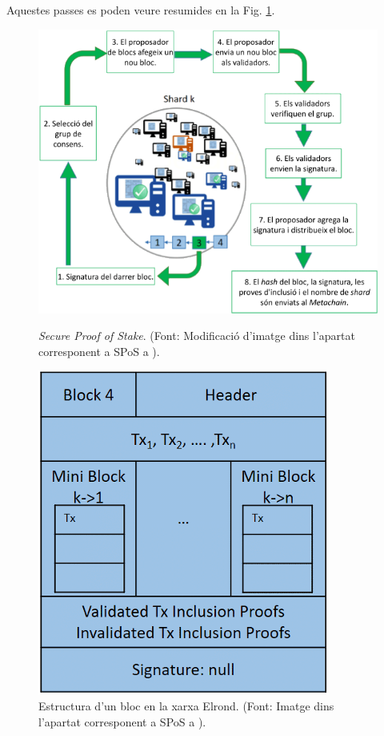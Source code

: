 \documentclass[11pt,a4paper]{article}
\begin{document}
Aquestes passes es poden veure resumides en la Fig. \ref{fig:SPoS}.

\begin{figure}[h]
  \centering
  \begin{minipage}[b]{0.65\textwidth}
    \includegraphics[width=\textwidth]{SPoS01.png}
    \caption{\textit{Secure Proof of Stake}. (Font: Modificació d'imatge dins l'apartat corresponent a SPoS a \cite{elrond2022}).}
    \label{fig:SPoS}
  \end{minipage}
  \hfill
  \begin{minipage}[b]{0.3\textwidth}
    \includegraphics[width=\textwidth]{SPoS02.png}
    \caption{Estructura d'un bloc en la xarxa Elrond. (Font: Imatge dins l'apartat corresponent a SPoS a \cite{elrond2022}).}
  \end{minipage}
\end{figure}
\end{document}
